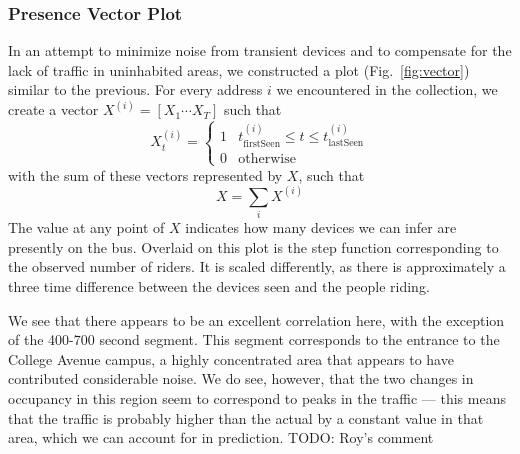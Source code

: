 \subsubsection*{Presence Vector Plot}

In an attempt to minimize noise from transient devices and to compensate for the lack of traffic in uninhabited areas, we constructed a plot (Fig.~\ref{fig:vector}) similar to the previous. 
For every address $i$ we encountered in the collection, we create a vector \(X^{(i)}= [ X_1 \cdots X_T ] \) such that
\begin{equation*}
  X_t^{(i)} = \begin{cases}
    1 & t_{\text{firstSeen}}^{(i)} \le t \le t_{\text{lastSeen}}^{(i)}\\
    0 & \text{otherwise}
  \end{cases}
\end{equation*}
with the sum of these vectors represented by $X$, such that \[X = \sum\limits_i X^{(i)}\]
The value at any point of $X$ indicates how many devices we can infer are presently on the bus.
Overlaid on this plot is the step function corresponding to the observed number of riders.
It is scaled differently, as there is approximately a three time difference between the devices seen and the people riding.

We see that there appears to be an excellent correlation here, with the exception of the 400-700 second segment. %
This segment corresponds to the entrance to the College Avenue campus, a highly concentrated area that appears to have contributed considerable noise.
We do see, however, that the two changes in occupancy in this region seem to correspond to peaks in the traffic --- this means that the traffic is probably higher than the actual by a constant value in that area, which we can account for in prediction. TODO: Roy's comment
